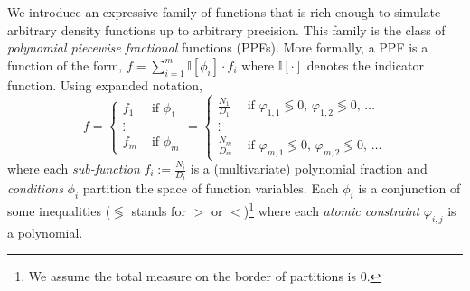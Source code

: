 \documentclass[letterpaper]{article}
\newcommand{\indicator}{\mathbb{I}}%
\newcommand{\case}[2]{#2 &\text{ if } #1}%
\begin{document}

We introduce an expressive family of functions that is rich enough to simulate arbitrary density functions up to arbitrary precision. 
This family is the class of \emph{polynomial piecewise fractional} functions (PPFs). More formally, a PPF is a function of the form,
$f = \sum_{i=1}^m \indicator[\phi_i]\cdot f_i $ where $\indicator[\cdot]$ denotes the indicator function. Using expanded notation, 
{\footnotesize
\begin{equation}
\label{e:ppf}
f =
  \begin{cases}
  \case{\phi_1}{f_1}\\
\vdots\\
  \case{\phi_m}{f_m}    
  \end{cases}
\!\!=
  \begin{cases}
  \case{\varphi_{1,1} \lessgtr 0,\, \varphi_{1,2} \lessgtr 0,\, \ldots}{\frac{N_1}{D_1}} \\
\vdots\\
   \case{\varphi_{m,1} \lessgtr 0,\, \varphi_{m,2} \lessgtr 0,\, \ldots}{\frac{N_m}{D_m}}    
  \end{cases}
\end{equation}
}
where each \emph{sub-function} $f_i := \frac{N_i}{D_i}$ is a (multivariate) polynomial fraction and
\emph{conditions} $\phi_i$ partition the space of function variables. 
Each $\phi_i$ is a conjunction of some inequalities ($\lessgtr$ stands for  
$>$ or $<$)\footnote{
We assume the total measure on the border of partitions is 0. 
} 
where each \emph{atomic constraint} $\varphi_{i,j}$ is a polynomial.
\end{document}
